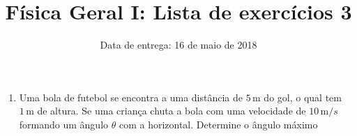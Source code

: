 \documentclass[fontsize=12pt]{scrartcl}
\title{Física Geral I: Lista de exercícios 3}
\author{Data de entrega: 16 de maio de 2018}
\date{}
\newcommand{\un}[1]{\mathrm{#1}}
\begin{document}
\maketitle
\begin{enumerate}
  \item Uma bola de futebol se encontra a uma distância de $5\,\un m$ do gol, o qual tem $1\,\un m$ de altura. Se uma criança chuta a bola com uma velocidade de $10\,\un m/s$ formando um ângulo $\theta$ com a horizontal. Determine o ângulo máximo 
\end{enumerate}
\end{document}

